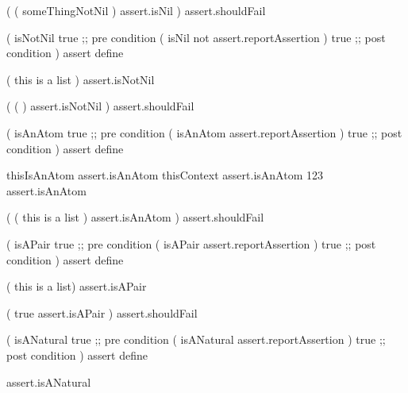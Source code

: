 \startJoylolTest
(
  ( someThingNotNil )
  assert.isNil
) assert.shouldFail
\stopJoylolTest
\stopTestCase

\stopTestSuite


\startJoylolCode
(
  isNotNil
  { true } ;; pre condition
  (
    isNil
    not
    assert.reportAssertion
  )
  { true } ;; post condition
)
assert
define
\stopJoylolCode

\startJoylolTest
( this is a list )
assert.isNotNil
\stopJoylolTest
\stopTestCase

\startJoylolTest
(
  ( )
  assert.isNotNil
) assert.shouldFail
\stopJoylolTest
\stopTestCase
\stopTestSuite


\startJoylolCode
(
  isAnAtom
  { true } ;; pre condition
  (
    isAnAtom
    assert.reportAssertion
  )
  { true } ;; post condition
)
assert
define
\stopJoylolCode

\startJoylolTest
thisIsAnAtom
assert.isAnAtom
thisContext
assert.isAnAtom
123
assert.isAnAtom
\stopJoylolTest
\stopTestCase

\startJoylolTest
(
  ( this is a list )
  assert.isAnAtom
) assert.shouldFail
\stopJoylolTest
\stopTestCase
\stopTestSuite


\startJoylolCode
(
  isAPair
  { true } ;; pre condition
  (
    isAPair
    assert.reportAssertion
  )
  { true } ;; post condition
)
assert
define
\stopJoylolCode

\startJoylolTest
( this is a list)
assert.isAPair
\stopJoylolTest
\stopTestCase

\startJoylolTest
(
  true
  assert.isAPair
) assert.shouldFail
\stopJoylolTest
\stopTestCase
\stopTestSuite


\startJoylolCode
(
  isANatural
  { true } ;; pre condition
  (
    isANatural
    assert.reportAssertion
  )
  { true } ;; post condition
)
assert
define
\stopJoylolCode

assert.isANatural
\stopJoylolTest
\stopTestCase

